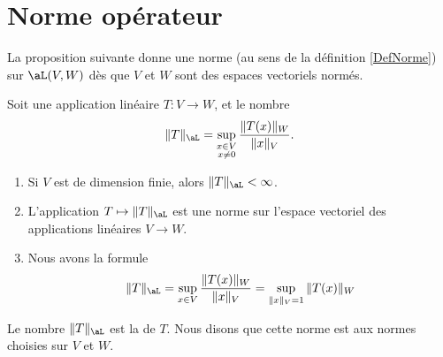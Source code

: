 \section{Norme opérateur}

La proposition suivante donne une norme (au sens de la définition \ref{DefNorme}) sur $\aL(V,W)$ dès que \( V\) et \( W\) sont des espaces vectoriels normés.
\begin{propositionDef}          \label{DefNFYUooBZCPTr}
    Soit une application linéaire \( T\colon V\to W\), et le nombre
	\begin{equation}
        \|T\|_{\aL}=\sup_{\substack{x\in V\\x\neq 0}}\frac{\|T(x)\|_{W}}{\|x\|_{V}}.
	\end{equation}
    \begin{enumerate}
        \item
            Si \( V\) est de dimension finie, alors \( \| T \|_{\aL}<\infty\).
        \item
            L'application \( T\mapsto\| T \|_{\aL}\) est une norme sur l'espace vectoriel des applications linéaires \( V\to W\).
        \item       \label{ITEMooUQPRooYQGZzu}
            Nous avons la formule
            \begin{equation}    \label{EqFZPooIoecGH}
                \| T \|_{\aL}=\sup_{x\in V}\frac{\|T(x)\|_{W}}{\|x\|_{V}} =\sup_{\|x\|_{V}=1}\|T(x)\|_{W}
            \end{equation}
    \end{enumerate}
    Le nombre \( \| T \|_{\aL}\) est la  de $T$. Nous disons que cette norme est  aux normes choisies sur \( V\) et \( W\). 
\end{propositionDef}

